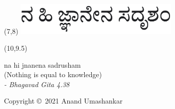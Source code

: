 \vspace*{\fill}

\begin{textblock}{10}(7,8)
\raggedleft\noindent\includegraphics[height=1.6cm]{images/quote.png}
\end{textblock}

\begin{textblock}{7}(10,9.5)
\begin{flushright}
\small{na hi jnanena sadrusham}\\
(Nothing is equal to knowledge)\\[1.5\baselineskip]

\LARGE{\textit{- Bhagavad Gita 4.38}\\}
\end{flushright}
\end{textblock}
\vspace*{\fill}

\small{Copyright \copyright\ 2021 Anand Umashankar}
\newpage